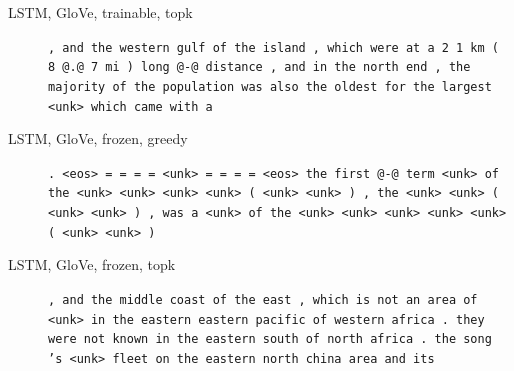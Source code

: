 \begin{description}
\item[LSTM, GloVe, trainable, topk] \texttt{\small , and the western gulf of the island , which were at a 2 \textendash{} 1 km ( 8 @.@ 7 mi ) long @-@ distance , and in the north end , the majority of the population was also the oldest for the largest \textless{}unk\textgreater{} which came with a}
\item[LSTM, GloVe, frozen, greedy] \texttt{\small . \textless{}eos\textgreater{} = = = = \textless{}unk\textgreater{} = = = = \textless{}eos\textgreater{} the first @-@ term \textless{}unk\textgreater{} of the \textless{}unk\textgreater{} \textless{}unk\textgreater{} \textless{}unk\textgreater{} \textless{}unk\textgreater{} ( \textless{}unk\textgreater{} \textless{}unk\textgreater{} ) , the \textless{}unk\textgreater{} \textless{}unk\textgreater{} ( \textless{}unk\textgreater{} \textless{}unk\textgreater{} ) , was a \textless{}unk\textgreater{} of the \textless{}unk\textgreater{} \textless{}unk\textgreater{} \textless{}unk\textgreater{} \textless{}unk\textgreater{} \textless{}unk\textgreater{} ( \textless{}unk\textgreater{} \textless{}unk\textgreater{} )}
\item[LSTM, GloVe, frozen, topk] \texttt{\small , and the middle coast of the east , which is not an area of \textless{}unk\textgreater{} in the eastern eastern pacific of western africa . they were not known in the eastern south of north africa . the song 's \textless{}unk\textgreater{} fleet on the eastern north china area and its}
\end{description}
